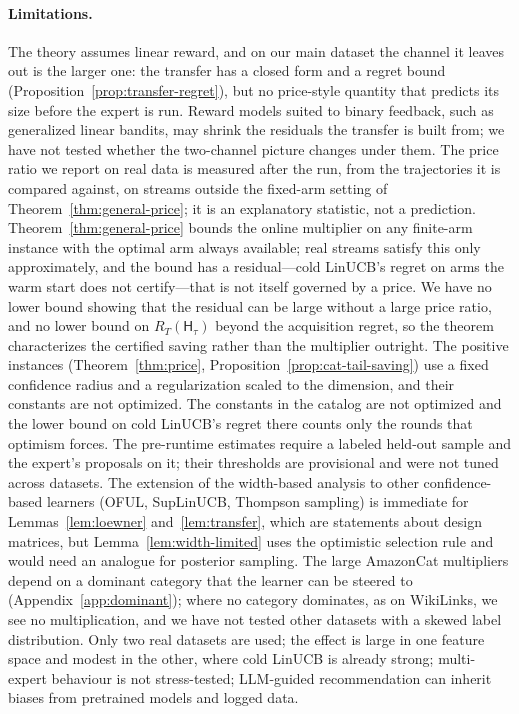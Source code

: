 \documentclass{article}
\theoremstyle{definition}
\theoremstyle{remark}
\theoremstyle{remark}
\newcommand{\Hyb}{\mathsf{H}}
\begin{document}
\paragraph{Limitations.}
The theory assumes linear reward, and on our main dataset the channel it
leaves out is the larger one: the transfer has a closed form and a regret bound
(Proposition~\ref{prop:transfer-regret}), but no price-style quantity that
predicts its size before the expert is run. Reward models suited to binary
feedback, such as generalized linear bandits, may shrink the residuals the
transfer is built from; we have not tested whether the two-channel picture
changes under them. The price ratio we report on real data is measured after
the run, from the trajectories it is compared against, on streams outside the
fixed-arm setting of Theorem~\ref{thm:general-price}; it is an explanatory
statistic, not a prediction. Theorem~\ref{thm:general-price} bounds the
online multiplier on any finite-arm instance with the optimal arm always
available; real streams satisfy this only approximately, and the bound has a
residual---cold LinUCB's regret on arms the warm start does not certify---that
is not itself governed by a price. We have no lower bound showing that the
residual can be large without a large price ratio, and no lower bound on
$R_T(\Hyb_\tau)$ beyond the acquisition regret, so the theorem characterizes
the certified saving rather than the multiplier outright. The positive
instances (Theorem~\ref{thm:price}, Proposition~\ref{prop:cat-tail-saving})
use a fixed confidence radius and a regularization scaled to the dimension,
and their constants are not optimized.
The constants in the catalog are not optimized and the lower bound on cold
LinUCB's regret there counts only the rounds that optimism forces. The pre-runtime estimates require a labeled held-out sample and the
expert's proposals on it; their thresholds are provisional and were not tuned
across datasets. The extension of the width-based analysis to other
confidence-based learners (OFUL, SupLinUCB, Thompson sampling) is immediate
for Lemmas~\ref{lem:loewner} and~\ref{lem:transfer}, which are statements
about design matrices, but Lemma~\ref{lem:width-limited} uses the optimistic
selection rule and would need an analogue for posterior sampling. The large
AmazonCat multipliers depend on a dominant category that the learner can be
steered to (Appendix~\ref{app:dominant}); where no category dominates, as on
WikiLinks, we see no multiplication, and we have not tested other datasets
with a skewed label distribution. Only two
real datasets are used; the effect is large in one feature space and modest in
the other, where cold LinUCB is already strong; multi-expert behaviour is not
stress-tested;
LLM-guided recommendation can inherit biases from pretrained models and
logged data.
\end{document}
